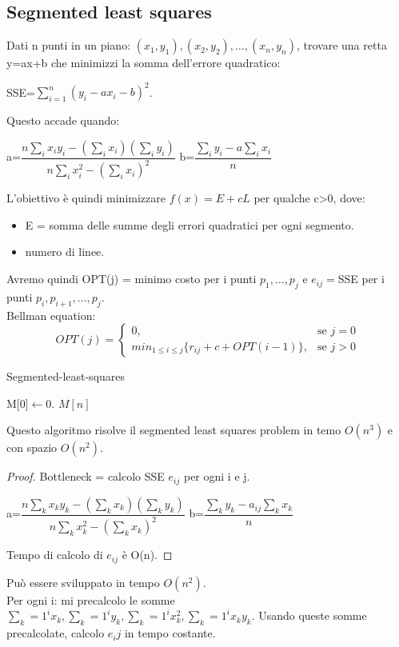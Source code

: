 \documentclass{article}
\begin{document}
\subsection{Segmented least squares}
Dati n punti in un piano: $(x_1,y_1), (x_2,y_2), \dots, (x_n,y_n)$, trovare una retta y=ax+b che minimizzi la somma dell'errore quadratico: 
\begin{center}
    SSE=$\sum_{i=1}^n(y_i-ax_i-b)^2$. 
\end{center}
Questo accade quando:
\begin{center}
    a=$\dfrac{n\sum_ix_iy_i-(\sum_ix_i)(\sum_iy_i)}{n\sum_ix_i^2-(\sum_ix_i)^2}$
    b=$\dfrac{\sum_iy_i-a\sum_ix_i}{n}$
\end{center}
L'obiettivo è quindi minimizzare $f(x)=E+cL$ per qualche c>0, dove:
\begin{itemize}
    \item E = somma delle summe degli errori quadratici per ogni segmento.
    \item numero di linee.
\end{itemize}
Avremo quindi OPT(j) = minimo costo per i punti $p_1,\dots,p_j$ e $e_{ij}=$SSE per i punti $p_i,p_{i+1},\dots,p_j$.\\ 
Bellman equation:\\
\[
OPT(j) =\begin{cases} 0, & \mbox{se }j=0 \\ min_{1\leq i \leq j}\{r_{ij}+c+OPT(i-1)\}, & \mbox{se }j>0
\end{cases}
\]
\begin{center}
\begin{algorithm}
\caption{Segmented-least-squares}
M[0]$\leftarrow$0.
\Return $M[n]$\;
\end{algorithm}
\end{center}
Questo algoritmo risolve il segmented least squares problem in temo $O(n^3)$ e con spazio $O(n^2)$.\\
\begin{proof}
    Bottleneck = calcolo SSE $e_{ij}$ per ogni i e j.\\
    \begin{center}
    a=$\dfrac{n\sum_kx_ky_k-(\sum_kx_k)(\sum_ky_k)}{n\sum_kx_k^2-(\sum_kx_k)^2}$
    b=$\dfrac{\sum_ky_k-a_{ij}\sum_kx_k}{n}$
    \end{center}
    Tempo di calcolo di $e_{ij}$ è O(n).
\end{proof}
Può essere sviluppato in tempo $O(n^2)$.\\ Per ogni i: mi precalcolo le somme $\sum_k=1^ix_k, \sum_k=1^iy_k, \sum_k=1^ix_k^2, \sum_k=1^ix_ky_k$. Usando queste somme precalcolate, calcolo $e_ij$ in tempo costante.
\end{document}
